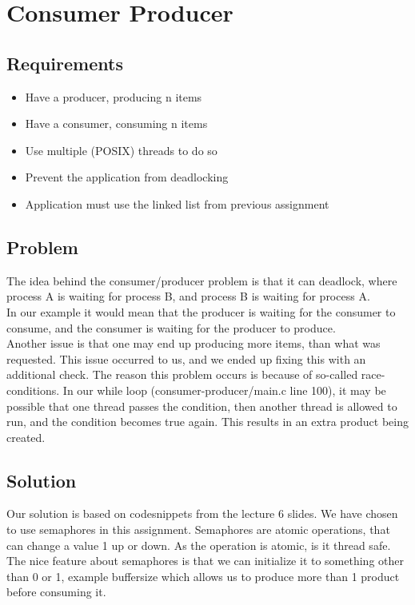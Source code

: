 \chapter{Consumer Producer}

\section{Requirements}

\begin{itemize}
\item Have a producer, producing n items
\item Have a consumer, consuming n items
\item Use multiple (POSIX) threads to do so
\item Prevent the application from deadlocking
\item Application must use the linked list from previous assignment
\end{itemize}

\section{Problem}

The idea behind the consumer/producer problem is that it can deadlock, where process A is waiting for process B, and process B is waiting for process A.\\



In our example it would mean that the producer is waiting for the consumer to consume, and the consumer is waiting for the producer to produce.\\

Another issue is that one may end up producing more items, than what was requested. This issue occurred to us, and we ended up fixing this with an additional check.
The reason this problem occurs is because of so-called race-conditions.
In our while loop (consumer-producer/main.c line 100), it may be possible that one thread passes the condition, then another thread is allowed to run, and the condition becomes true again. This results in an extra product being created.

\section{Solution}
Our solution is based on codesnippets from the lecture 6 slides.
We have chosen to use semaphores in this assignment. Semaphores are atomic operations, that can change a value 1 up or down. As the operation is atomic, is it thread safe. The nice feature about semaphores is that we can initialize it to something other than 0 or 1, example buffersize which allows us to produce more than 1 product before consuming it.
\\



